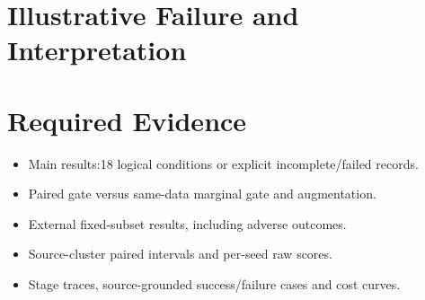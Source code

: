 \documentclass[10pt,twocolumn,letterpaper]{article}
\begin{document}
\section{Illustrative Failure and Interpretation}
\section{Required Evidence}
\begin{itemize}
\item Main results:18 logical conditions or explicit incomplete/failed records.
\item Paired gate versus same-data marginal gate and augmentation.
\item External fixed-subset results, including adverse outcomes.
\item Source-cluster paired intervals and per-seed raw scores.
\item Stage traces, source-grounded success/failure cases and cost curves.
\end{itemize}
\end{document}

